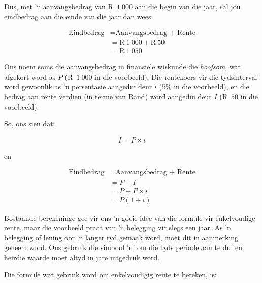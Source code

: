 Dus, met ’n aanvangsbedrag van R~$1~000$ aan die begin van die jaar, sal jou eindbedrag aan die einde van die jaar dan wees:\par 
\begin{align*}
    \mbox{Eindbedrag} &= \mbox{Aanvangsbedrag + Rente}\\
    &= \mbox{R}~1~000 + \mbox{R}~50\\
    &= \mbox{R}~1~050
\end{align*}

Ons noem soms die aanvangsbedrag in finansiële wiskunde die \textit{hoofsom}, wat afgekort word as $P$ (R~$1~000$ in die voorbeeld). Die rentekoers vir die tydsinterval word gewoonlik as ’n persentasie aangedui deur $i$ ($5\%$ in die voorbeeld),  en die bedrag aan rente verdien (in terme van Rand) word aangedui deur $I$ (R~$50$ in die voorbeeld).\par 

So, ons sien dat:
        
\begin{align*}
    I = P \times i
\end{align*}

en

\begin{align*}
    \mbox{Eindbedrag} &= \mbox{Aanvangsbedrag + Rente} \nonumber\\
    &= P + I \nonumber\\
    &= P + P \times i\nonumber\\
    &= P(1 + i)
\end{align*}



Bostaande berekeninge gee vir ons 'n goeie idee van die formule vir enkelvoudige rente, maar die voorbeeld praat van 'n belegging vir slegs een jaar. As 'n belegging of lening oor 'n langer tyd gemaak word, moet dit in aanmerking geneem word. Ons gebruik die simbool 'n' om die tyds periode aan te dui en heirdie waarde moet altyd in jare uitgedruk word.\par

Die formule wat gebruik word om enkelvoudigig rente te bereken, is:






